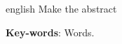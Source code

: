 \begin{resumo}[Abstract]
 \begin{otherlanguage*}{english}
 Make the abstract

   \vspace{\onelineskip}
 
   \noindent 
   \textbf{Key-words}: Words.
 \end{otherlanguage*}
\end{resumo}
